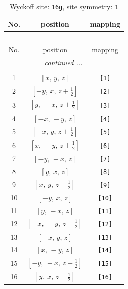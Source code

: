 \documentclass[fleqn,8pt]{jsarticle}
\begin{document}
\begin{longtable}{ccc}
\caption{Wyckoff site: {\tt 16g}, site symmetry: {\tt 1}}
 \\
 \hline \hline
No. & position & mapping \\ \hline \endfirsthead

\multicolumn{2}{l}{\tablename\ \thetable{}} \\
 \hline \hline
No. & position & mapping \\ \hline \endhead

 \hline \hline
\multicolumn{2}{r}{\footnotesize\it continued ...} \\ \endfoot

 \hline \hline
\multicolumn{2}{r}{} \\ \endlastfoot

1 & $\left[ x,\, y,\, z \right]$ & {\tt [1]} \\ \hline
2 & $\left[ - y,\, x,\, z + \frac{1}{2} \right]$ & {\tt [2]} \\ \hline
3 & $\left[ y,\, - x,\, z + \frac{1}{2} \right]$ & {\tt [3]} \\ \hline
4 & $\left[ - x,\, - y,\, z \right]$ & {\tt [4]} \\ \hline
5 & $\left[ - x,\, y,\, z + \frac{1}{2} \right]$ & {\tt [5]} \\ \hline
6 & $\left[ x,\, - y,\, z + \frac{1}{2} \right]$ & {\tt [6]} \\ \hline
7 & $\left[ - y,\, - x,\, z \right]$ & {\tt [7]} \\ \hline
8 & $\left[ y,\, x,\, z \right]$ & {\tt [8]} \\ \hline
9 & $\left[ x,\, y,\, z + \frac{1}{2} \right]$ & {\tt [9]} \\ \hline
10 & $\left[ - y,\, x,\, z \right]$ & {\tt [10]} \\ \hline
11 & $\left[ y,\, - x,\, z \right]$ & {\tt [11]} \\ \hline
12 & $\left[ - x,\, - y,\, z + \frac{1}{2} \right]$ & {\tt [12]} \\ \hline
13 & $\left[ - x,\, y,\, z \right]$ & {\tt [13]} \\ \hline
14 & $\left[ x,\, - y,\, z \right]$ & {\tt [14]} \\ \hline
15 & $\left[ - y,\, - x,\, z + \frac{1}{2} \right]$ & {\tt [15]} \\ \hline
16 & $\left[ y,\, x,\, z + \frac{1}{2} \right]$ & {\tt [16]} \\
\end{longtable}
\end{document}
